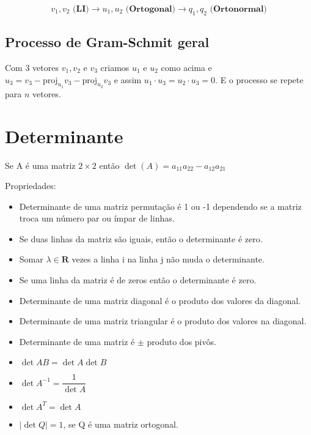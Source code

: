 \documentclass[12pt]{article}
\begin{document}
$$v_1, v_2 \textbf{ (LI)} \xrightarrow{} u_1, u_2 \textbf{ (Ortogonal)} \xrightarrow{} q_1, q_2 \textbf{ (Ortonormal)}$$

\subsection*{Processo de Gram-Schmit geral}
Com 3 vetores $v_1, v_2$ e $v_3$ criamos $u_1$ e $u_2$ como acima e $u_3 = v_3 - \text{proj}_{u_1} v_3 - \text{proj}_{u_2} v_3$ e assim $u_1 \cdot u_3 = u_2 \cdot u_3 = 0$. E o processo se repete para $n$ vetores.

\section*{Determinante}
\label{s2}
Se A é uma matriz $2 \times 2$ então $\det(A) = a_{11}a_{22} - a_{12}a_{21}$

Propriedades:
\begin{itemize}
    \item Determinante de uma matriz permutação é 1 ou -1 dependendo se a matriz troca um número par ou ímpar de linhas.
    
    \item Se duas linhas da matriz são iguais, então o determinante é zero.
    
    \item Somar $\lambda \in \mathbf{R}$ vezes a linha i na linha j não muda o determinante.
    
    \item Se uma linha da matriz é de zeros então o determinante é zero.
    
    \item Determinante de uma matriz diagonal é o produto dos valores da diagonal.
    
    \item Determinante de uma matriz triangular é o produto dos valores na diagonal.
    
    \item Determinante de uma matriz é $\pm$ produto dos pivôs.
    
    \item $\det AB = \det A \det B$
    
    \item $\det A^{-1} = \dfrac{1}{\det A}$
    
    \item $\det A^T = \det A$
    
    \item $|\det Q| = 1$, se Q é uma matriz ortogonal.
\end{itemize}
\end{document}
